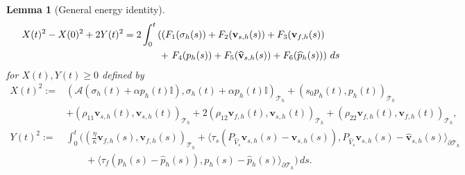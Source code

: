\documentclass[10pt,letterpaper]{amsart}
\theoremstyle{plain} %
\newtheorem{lemma}[theorem]{Lemma} %
\theoremstyle{remark} %
\newcommand{\vect}[1]{\mathbf{#1}}
\newcommand{\Id}{\mathbb{I}} %
\newcommand{\Ael}{\mathcal{A}} %
\newcommand{\Thprod}[2]{( #1, #2 )_{\mathcal{T}_h}}
\newcommand{\pThprod}[2]{\langle #1, #2 \rangle_{\partial \mathcal{T}_{h}}}
\begin{document}
\begin{lemma}[General energy identity]
	\begin{align}
		\label{eq:semidiscrete-energy-identity}
		X(t)^2 - X(0)^2 + 2Y(t)^2 = 2 \int_0^t &\left( (F_1(\sigma_h(s)) + F_2(\vect{v}_{s,h}(s)) + F_3(\vect{v}_{f,h} (s)) \right.  
		\\
		\notag
		& \;+ \left. F_4(p_h(s)) + F_5(\widehat{\vect{v}}_{s,h}(s)) + F_6(\widehat{p}_h(s))\right) \, ds
	\end{align}
	for $X(t), Y(t) \ge 0$ defined by  
	\begin{align*}
		X(t)^2 := &\Thprod{\Ael({\sigma}_{h}(t) + \alpha {p}_{h}(t) \Id)}{{\sigma}_{h}(t) + \alpha {p}_{h}(t) \Id} +\Thprod{s_{0}{p}_{h}(t)}{p_h(t)}
		\\
		& + \Thprod{\rho_{11}{\vect{v}}_{s,h}(t)}{\vect{v}_{s,h}(t)} + 2\Thprod{\rho_{12}{\vect{v}}_{f,h}(t)}{\vect{v}_{s,h}(t)}  + \Thprod{\rho_{22}{\vect{v}}_{f,h}(t)}{\vect{v}_{f,h}(t)} ,
		\\
		Y(t)^2 :=&\int_0^t \Big( \Thprod{\frac{\eta}{\kappa} \vect{v}_{f,h}(s)}{\vect{v}_{f,h}(s)}  + \pThprod{\tau_{s} ({P_{\widehat{V}_s}} \vect{v}_{s,h}(s) - \widehat{\vect{v}}_{s,h}(s))}{{P_{\widehat{V}_s}}\vect{v}_{s,h}(s)-\widehat{\vect{v}}_{s,h}(s) } 
		\\
		&\qquad +  \pThprod{\tau_{f} (p_{h}(s) - \widehat{p}_{h}(s))}{p_h(s)-\widehat{p}_h(s)} \Big) \,ds. 
	\end{align*}
\end{lemma}
%
\end{document}
